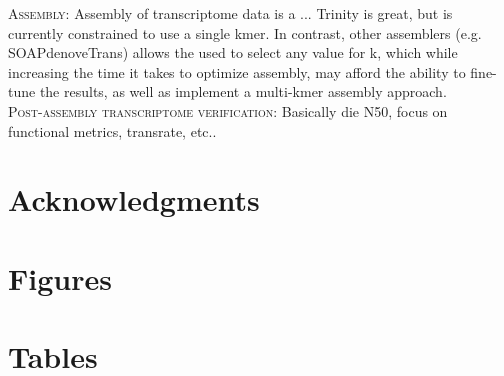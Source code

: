 \documentclass[11pt]{article}
\begin{document}
\textsc{Assembly}: Assembly of transcriptome data is a ... Trinity is great, but is currently constrained to use a single kmer. In contrast, other assemblers (e.g. SOAPdenoveTrans) allows the used to select any value for k, which while increasing the time it takes to optimize assembly, may afford the ability to fine-tune the results, as well as implement a multi-kmer assembly approach. \\


\textsc{Post-assembly transcriptome verification}: Basically die N50, focus on functional metrics, transrate, etc.. \\



\section*{Acknowledgments}




\section*{Figures}


\section*{Tables}
\end{document}

